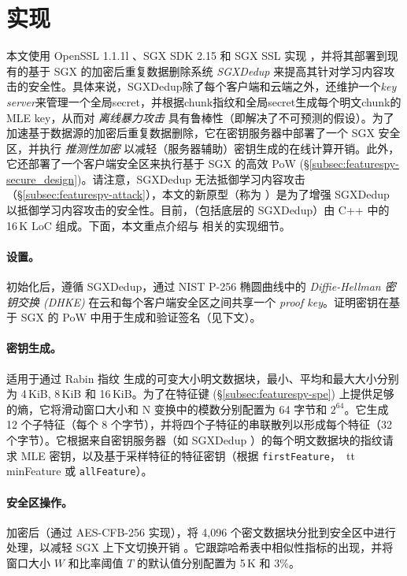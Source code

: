 \section{实现}
\label{sec:featurespy-implementation}
本文使用 OpenSSL 1.1.1l \cite{openssl}、SGX SDK 2.15 \cite{sgxsdk} 和 SGX SSL \cite{sgxssl} 实现 \sysnameF，并将其部署到现有的基于 SGX 的加密后重复数据删除系统 {\em SGXDedup} \cite{ren21} 来提高其针对学习内容攻击的安全性。具体来说，SGXDedup除了每个客户端和云端之外，还维护一个{\em key server}来管理一个全局secret，并根据chunk指纹和全局secret生成每个明文chunk的MLE key，从而对 {\em 离线暴力攻击} 具有鲁棒性（即解决了不可预测的假设）\cite{bellare2013DupLESS}。为了加速基于数据源的加密后重复数据删除，它在密钥服务器中部署了一个 SGX 安全区，并执行 {\em 推测性加密} \cite{eduardo19} 以减轻（服务器辅助）密钥生成的在线计算开销。此外，它还部署了一个客户端安全区来执行基于 SGX 的高效 PoW (\S\ref{subsec:featurespy-secure_design})。请注意，SGXDedup 无法抵御学习内容攻击（\S\ref{subsec:featurespy-attack}），本文的新原型（称为 \prototype）是为了增强 SGXDedup 以抵御学习内容攻击的安全性。目前，\prototype（包括底层的 SGXDedup）由 C++ 中的 16\,K LoC 组成。下面，本文重点介绍与 \prototype 相关的实现细节。


\paragraph*{设置。}
初始化后，\prototype 遵循 SGXDedup，通过 NIST P-256 椭圆曲线中的 {\em Diffie-Hellman 密钥交换 (DHKE)} 在云和每个客户端安全区之间共享一个 {\em proof key}。证明密钥在基于 SGX 的 PoW 中用于生成和验证签名（见下文）。


\paragraph*{密钥生成。}
\prototype 适用于通过 Rabin 指纹 \cite{rabin81} 生成的可变大小明文数据块，最小、平均和最大大小分别为 4\,KiB, 8\,KiB 和 16\,KiB。为了在特征键 (\S\ref{subsec:featurespy-spe}) 上提供足够的熵，它将滑动窗口大小和 N 变换中的模数分别配置为 64 字节和 $2^{64}$。它生成 12 个子特征（每个 8 个字节），并将四个子特征的串联散列以形成每个特征（32 个字节）。它根据来自密钥服务器（如 SGXDedup \cite{ren21}）的每个明文数据块的指纹请求 MLE 密钥，以及基于采样特征的特征密钥（根据 {\tt firstFeature}，{\ tt minFeature} 或 {\tt allFeature}）。


\paragraph*{安全区操作。}
加密后（通过 AES-CFB-256 实现），\prototype 将 4,096 个密文数据块分批到安全区中进行处理，以减轻 SGX 上下文切换开销 \cite{arnautov2016SCONE}。它跟踪哈希表中相似性指标的出现，并将窗口大小 $W$ 和比率阈值 $T$ 的默认值分别配置为 5\,K 和 3\%。

